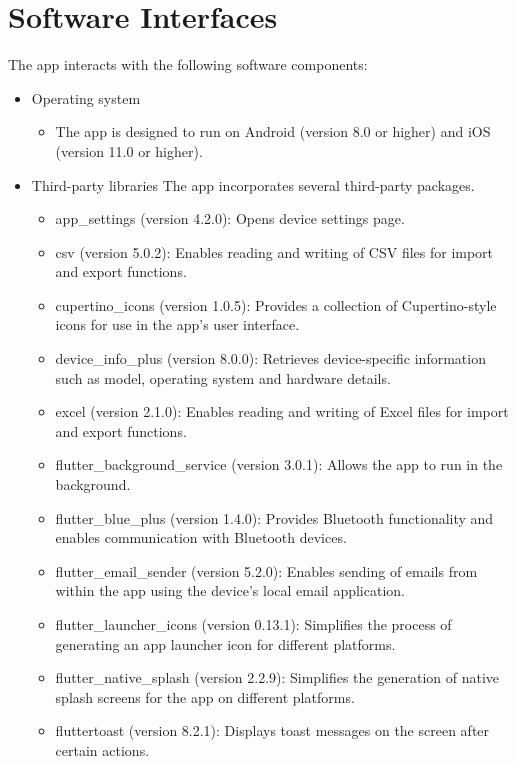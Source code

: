 \documentclass[a4paper]{scrreprt}
\begin{document}
\section{Software Interfaces}
The app interacts with the following software components:
\begin{itemize}
    \item Operating system
    \begin{itemize}
        \item The app is designed to run on Android (version 8.0 or higher) and iOS (version 11.0 or higher).
    \end{itemize}
    \item Third-party libraries
    The app incorporates several third-party packages.
    \begin{itemize}
        \item app\_settings (version 4.2.0): Opens device settings page.
        \item csv (version 5.0.2): Enables reading and writing of CSV files for import and export functions.
        \item cupertino\_icons (version 1.0.5): Provides a collection of Cupertino-style icons for use in the app's user interface.
        \item device\_info\_plus (version 8.0.0): Retrieves device-specific information such as model, operating system and hardware details.
        \item excel (version 2.1.0): Enables reading and writing of Excel files for import and export functions.
        \item flutter\_background\_service (version 3.0.1): Allows the app to run in the background.
        \item flutter\_blue\_plus (version 1.4.0): Provides Bluetooth functionality and enables communication with Bluetooth devices.
        \item flutter\_email\_sender (version 5.2.0): Enables sending of emails from within the app using the device's local email application.
        \item flutter\_launcher\_icons (version 0.13.1): Simplifies the process of generating an app launcher icon for different platforms.
        \item flutter\_native\_splash (version 2.2.9): Simplifies the generation of native splash screens for the app on different platforms.
        \item fluttertoast (version 8.2.1): Displays toast messages on the screen after certain actions.

\end{itemize}
\end{itemize}
\end{document}
